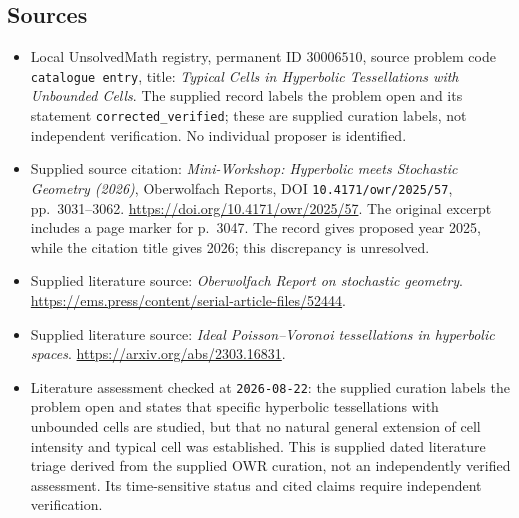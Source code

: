 \documentclass[11pt]{article}
\begin{document}
\subsection{Sources}
\begin{itemize}
\item Local UnsolvedMath registry, permanent ID \(30006510\), source problem code \texttt{catalogue entry}, title: \emph{Typical Cells in Hyperbolic Tessellations with Unbounded Cells}. The supplied record labels the problem open and its statement \texttt{corrected\_verified}; these are supplied curation labels, not independent verification. No individual proposer is identified.
\item Supplied source citation: \emph{Mini-Workshop: Hyperbolic meets Stochastic Geometry (2026)}, Oberwolfach Reports, DOI \texttt{10.4171/owr/2025/57}, pp.\ 3031--3062. \url{https://doi.org/10.4171/owr/2025/57}. The original excerpt includes a page marker for p.\ 3047. The record gives proposed year 2025, while the citation title gives 2026; this discrepancy is unresolved.
\item Supplied literature source: \emph{Oberwolfach Report on stochastic geometry}. \url{https://ems.press/content/serial-article-files/52444}.
\item Supplied literature source: \emph{Ideal Poisson--Voronoi tessellations in hyperbolic spaces}. \url{https://arxiv.org/abs/2303.16831}.
\item Literature assessment checked at \texttt{2026-08-22}: the supplied curation labels the problem open and states that specific hyperbolic tessellations with unbounded cells are studied, but that no natural general extension of cell intensity and typical cell was established. This is supplied dated literature triage derived from the supplied OWR curation, not an independently verified assessment. Its time-sensitive status and cited claims require independent verification.
\end{itemize}
\end{document}
